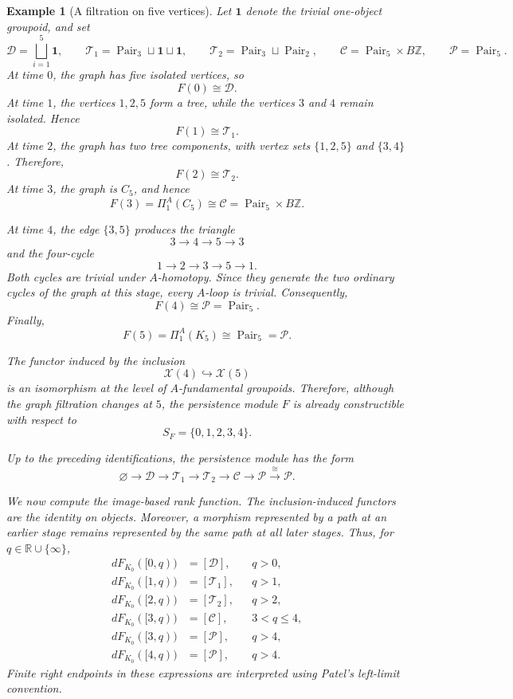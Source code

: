 \documentclass{amsart}
\newcommand{\R}{\mathbb{R}}
\newcommand{\Z}{\mathbb{Z}}
\newtheorem{example}[theorem]{Example}
\begin{document}
\begin{example}[A filtration on five vertices]
Let \(\mathbf{1}\) denote the trivial one-object groupoid, and set
\[
\mathcal{D}
=
\bigsqcup_{i=1}^{5}\mathbf{1},\qquad \mathcal{T}_1
=
\operatorname{Pair}_3
\sqcup\mathbf{1}\sqcup\mathbf{1},\qquad
\mathcal{T}_2
=
\operatorname{Pair}_3
\sqcup\operatorname{Pair}_2,\qquad
\mathcal{C}
=
\operatorname{Pair}_5\times B\Z,\qquad
\mathcal{P}
=
\operatorname{Pair}_5.
\]
At time \(0\), the graph has five isolated vertices, so
\[
F(0)\cong\mathcal{D}.
\]
At time \(1\), the vertices \(1,2,5\) form a tree, while the vertices
\(3\) and \(4\) remain isolated. Hence
\[
F(1)\cong\mathcal{T}_1.
\]
At time \(2\), the graph has two tree components, with vertex sets
\(\{1,2,5\}\) and \(\{3,4\}\). Therefore,
\[
F(2)\cong\mathcal{T}_2.
\]
At time \(3\), the graph is \(C_5\), and hence
\[
F(3)
=
\Pi_1^A(C_5)
\cong
\mathcal{C}
=
\operatorname{Pair}_5\times B\Z.
\]

At time \(4\), the edge \(\{3,5\}\) produces the triangle
\[
3\longrightarrow4\longrightarrow5\longrightarrow3
\]
and the four-cycle
\[
1\longrightarrow2\longrightarrow3
\longrightarrow5\longrightarrow1.
\]
Both cycles are trivial under \(A\)-homotopy. Since they generate the
two ordinary cycles of the graph at this stage, every \(A\)-loop is
trivial. Consequently,
\[
F(4)\cong\mathcal{P}
=
\operatorname{Pair}_5.
\]
Finally,
\[
F(5)
=
\Pi_1^A(K_5)
\cong
\operatorname{Pair}_5
=
\mathcal{P}.
\]

The functor induced by the inclusion
\[
\mathcal{X}(4)\hookrightarrow\mathcal{X}(5)
\]
is an isomorphism at the level of \(A\)-fundamental groupoids.
Therefore, although the graph filtration changes at \(5\), the
persistence module \(F\) is already constructible with respect to
\[
S_F=\{0,1,2,3,4\}.
\]

Up to the preceding identifications, the persistence module has the
form
\[
\varnothing
\longrightarrow
\mathcal{D}
\longrightarrow
\mathcal{T}_1
\longrightarrow
\mathcal{T}_2
\longrightarrow
\mathcal{C}
\longrightarrow
\mathcal{P}
\xrightarrow{\cong}
\mathcal{P}.
\]

We now compute the image-based rank function. The inclusion-induced
functors are the identity on objects. Moreover, a morphism represented
by a path at an earlier stage remains represented by the same path at
all later stages. Thus, for
\(q\in\R\cup\{\infty\}\),
\begin{align*}
dF_{K_0}([0,q))
&=[\mathcal{D}],
&&q>0,\\
dF_{K_0}([1,q))
&=[\mathcal{T}_1],
&&q>1,\\
dF_{K_0}([2,q))
&=[\mathcal{T}_2],
&&q>2,\\
dF_{K_0}([3,q))
&=[\mathcal{C}],
&&3<q\leq4,\\
dF_{K_0}([3,q))
&=[\mathcal{P}],
&&q>4,\\
dF_{K_0}([4,q))
&=[\mathcal{P}],
&&q>4.
\end{align*}
Finite right endpoints in these expressions are interpreted using
Patel's left-limit convention.


\end{example}
\end{document}
